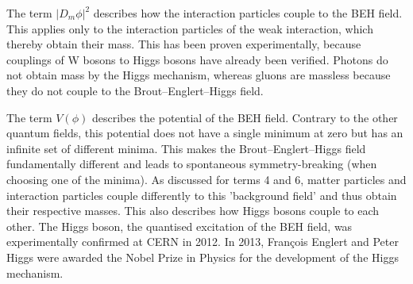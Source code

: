 The term $|D_m \phi|^2$ describes how the interaction particles couple to the BEH field. This applies only to the interaction particles of the weak interaction, which thereby obtain their mass. This has been proven experimentally, because couplings of W bosons to Higgs bosons have already been verified. Photons do not obtain mass by the Higgs mechanism, whereas gluons are massless because they do not couple to the Brout–Englert–Higgs field.

The term $V(\phi)$ describes the potential of the BEH field. Contrary to the other quantum fields, this potential does not have a single minimum at zero but has an infinite set of different minima. This makes the Brout–Englert–Higgs field fundamentally different and leads to spontaneous symmetry-breaking (when choosing one of the minima). As discussed for terms 4 and 6, matter particles and interaction particles couple differently to this 'background field' and thus obtain their respective masses. This also describes how Higgs bosons couple to each other. The Higgs boson, the quantised excitation of the BEH field, was experimentally confirmed at CERN in 2012. In 2013, François Englert and Peter Higgs were awarded the Nobel Prize in Physics for the development of the Higgs mechanism.











